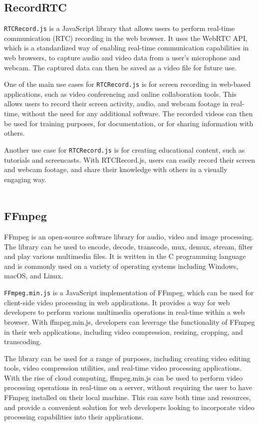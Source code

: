 \subsection{RecordRTC}
\texttt{RTCRecord.js} is a JavaScript library that allows users to perform real-time communication (RTC) 
recording in the web browser. It uses the WebRTC API, which is a standardized way of enabling 
real-time communication capabilities in web browsers, to capture audio and video data from a 
user's microphone and webcam. The captured data can then be saved as a video file for future use.

One of the main use cases for \texttt{RTCRecord.js} is for screen recording in web-based applications, 
such as video conferencing and online collaboration tools. This allows users to record their 
screen activity, audio, and webcam footage in real-time, without the need for any additional 
software. The recorded videos can then be used for training purposes, for documentation, 
or for sharing information with others.

Another use case for \texttt{RTCRecord.js} is for creating educational content, such as tutorials 
and screencasts. With RTCRecord.js, users can easily record their screen and webcam footage, 
and share their knowledge with others in a visually engaging way. \cite{rtcrecord}
\\
\\
\subsection{FFmpeg}
FFmpeg is an open-source software library for audio, video and image processing. 
The library can be used to encode, decode, transcode, mux, demux, stream, filter and play various 
multimedia files. It is written in the C programming language and is commonly used on a variety of 
operating systems including Windows, macOS, and Linux.

\texttt{FFmpeg.min.js} is a JavaScript implementation of FFmpeg, which can be used for client-side video 
processing in web applications. It provides a way for web developers to perform various multimedia 
operations in real-time within a web browser. With ffmpeg.min.js, developers can leverage the 
functionality of FFmpeg in their web applications, including video compression, resizing, cropping, and transcoding.

The library can be used for a range of purposes, including creating video editing tools, video 
compression utilities, and real-time video processing applications. With the rise of cloud computing, 
ffmpeg.min.js can be used to perform video processing operations in real-time on a server, without requiring 
the user to have FFmpeg installed on their local machine. This can save both time and resources, and provide 
a convenient solution for web developers looking to incorporate video processing capabilities into their applications. \cite{ffmpeg}
\\
\\
